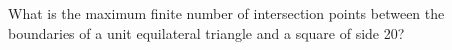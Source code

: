 What is the maximum finite number of intersection points between the boundaries of a unit equilateral triangle and a square of side 20?
